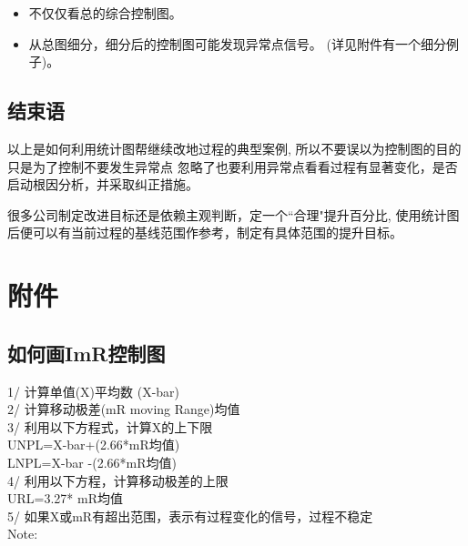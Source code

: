 \begin{itemize}
\tightlist
\item
  不仅仅看总的综合控制图。
\item
  从总图细分，细分后的控制图可能发现异常点信号。
  (详见附件有一个细分例子)。
\end{itemize}

\hypertarget{ux603bux7ed3}{%
\subsection{结束语}\label{ux603bux7ed3}}

以上是如何利用统计图帮继续改地过程的典型案例,
所以不要误以为控制图的目的只是为了控制不要发生异常点
忽略了也要利用异常点看看过程有显著变化，是否启动根因分析，并采取纠正措施。

很多公司制定改进目标还是依赖主观判断，定一个``合理"提升百分比,
使用统计图后便可以有当前过程的基线范围作参考，制定有具体范围的提升目标。

\hypertarget{ux9644ux4ef6}{%
\section{附件}\label{ux9644ux4ef6}}

\hypertarget{ux5982ux4f55ux753bimrux63a7ux5236ux56fe}{%
\subsection{如何画ImR控制图}\label{ux5982ux4f55ux753bimrux63a7ux5236ux56fe}}

1/ 计算单值(X)平均数 (X-bar)\\
2/ 计算移动极差(mR moving Range)均值\\
3/ 利用以下方程式，计算X的上下限\\
UNPL=X-bar+(2.66*mR均值)\\
LNPL=X-bar -(2.66*mR均值)\\
4/ 利用以下方程，计算移动极差的上限\\
URL=3.27* mR均值\\
5/ 如果X或mR有超出范围，表示有过程变化的信号，过程不稳定\\
Note:

\begin{description}
\item[]
\end{description}

